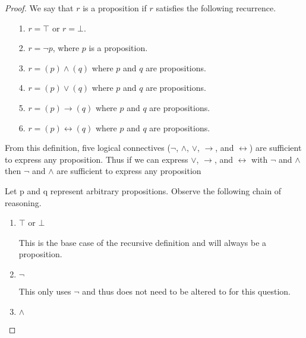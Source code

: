 \documentclass{article}
\begin{document}
\begin {enumerate}
\begin{proof}
    We say that $r$ is a proposition if $r$ satisfies the following recurrence.
    \begin{enumerate}
        \item[1.] $r = \top$ or $r = \bot$.
        \item[2.] $r = \neg p$, where $p$ is a proposition.
        \item[3.] $r = (p) \land (q)$ where $p$ and $q$ are propositions.
        \item[4.] $r = (p) \lor (q)$ where $p$ and $q$ are propositions.
        \item[5.] $r = (p) \rightarrow (q)$ where $p$ and $q$ are propositions.
        \item[6.] $r = (p) \leftrightarrow (q)$ where $p$ and $q$ are propositions.
    \end{enumerate}
    From this definition, five logical connectives ($\neg$, $\land$, $\lor$,  $\rightarrow$, and $\leftrightarrow$) are sufficient to express any proposition. Thus if we can express $\lor$, $\rightarrow$, and $\leftrightarrow$ with $\neg$ and $\land$ then $\neg$ and $\land$ are sufficient to express any proposition

    Let p and q  represent arbitrary propositions. Observe the following chain of reasoning.
    \begin{enumerate}
        \item $\top$ or $\bot$
            
            This is the base case of the recursive definition and will always be a proposition.
        \item $\neg$
            
            This only uses $\neg$ and thus does not need to be altered to for this question.
        \item $\land$
            

\end{enumerate}
\end{proof}
\end{enumerate}
\end{document}
